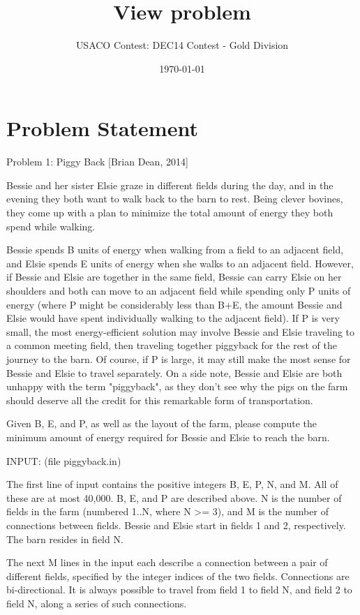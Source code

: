 \documentclass[12pt]{article}
\title{View problem}
\author{USACO Contest: DEC14 Contest - Gold Division}
\date{\today}
\begin{document}
\maketitle

\section*{Problem Statement}

Problem 1: Piggy Back [Brian Dean, 2014]

Bessie and her sister Elsie graze in different fields during the day,
and in the evening they both want to walk back to the barn to rest.
Being clever bovines, they come up with a plan to minimize the total
amount of energy they both spend while walking.

Bessie spends B units of energy when walking from a field to an
adjacent field, and Elsie spends E units of energy when she walks to
an adjacent field.  However, if Bessie and Elsie are together in the
same field, Bessie can carry Elsie on her shoulders and both can move
to an adjacent field while spending only P units of energy (where P
might be considerably less than B+E, the amount Bessie and Elsie would
have spent individually walking to the adjacent field).  If P is very
small, the most energy-efficient solution may involve Bessie and Elsie
traveling to a common meeting field, then traveling together piggyback
for the rest of the journey to the barn.  Of course, if P is large, it
may still make the most sense for Bessie and Elsie to travel
separately.  On a side note, Bessie and Elsie are both unhappy with
the term "piggyback", as they don't see why the pigs on the farm
should deserve all the credit for this remarkable form of
transportation.

Given B, E, and P, as well as the layout of the farm, please compute
the minimum amount of energy required for Bessie and Elsie to reach
the barn.

INPUT: (file piggyback.in)

The first line of input contains the positive integers B, E, P, N, and
M.  All of these are at most 40,000.  B, E, and P are described above.
N is the number of fields in the farm (numbered 1..N, where N >= 3),
and M is the number of connections between fields.  Bessie and Elsie
start in fields 1 and 2, respectively.  The barn resides in field N.

The next M lines in the input each describe a connection between a
pair of different fields, specified by the integer indices of the two
fields.  Connections are bi-directional.  It is always possible to
travel from field 1 to field N, and field 2 to field N, along a series
of such connections.  
\end{document}
